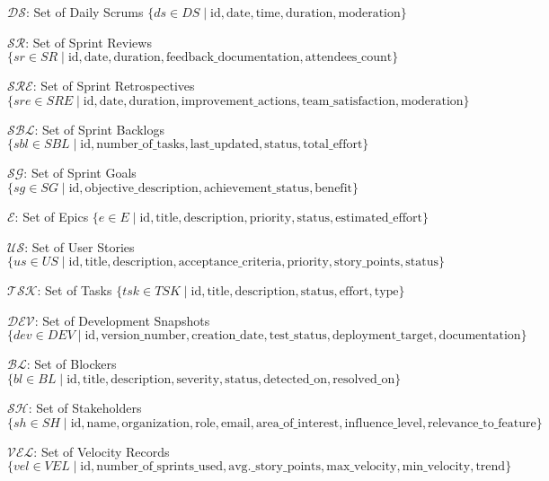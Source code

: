 \documentclass[12pt]{article}
\begin{document}
    \item $ \mathcal{DS} $: Set of Daily Scrums $ \{ ds \in DS \mid \text{id}, \text{date}, \text{time}, \text{duration}, \text{moderation} \} $
    \item $ \mathcal{SR} $: Set of Sprint Reviews $ \{ sr \in SR \mid \text{id}, \text{date}, \text{duration}, \text{feedback\_documentation}, \text{attendees\_count} \} $
    \item $ \mathcal{SRE} $: Set of Sprint Retrospectives $ \{ sre \in SRE \mid \text{id}, \text{date}, \text{duration}, \text{improvement\_actions}, \text{team\_satisfaction}, \text{moderation} \} $
    \item $ \mathcal{SBL} $: Set of Sprint Backlogs $ \{ sbl \in SBL \mid \text{id}, \text{number\_of\_tasks}, \text{last\_updated}, \text{status}, \text{total\_effort} \} $
    \item $ \mathcal{SG} $: Set of Sprint Goals $ \{ sg \in SG \mid \text{id}, \text{objective\_description}, \text{achievement\_status}, \text{benefit} \} $
    \item $ \mathcal{E} $: Set of Epics $ \{ e \in E \mid \text{id}, \text{title}, \text{description}, \text{priority}, \text{status}, \text{estimated\_effort} \} $
    \item $ \mathcal{US} $: Set of User Stories $ \{ us \in US \mid \text{id}, \text{title}, \text{description}, \text{acceptance\_criteria}, \text{priority}, \text{story\_points}, \text{status} \} $
    \item $ \mathcal{TSK} $: Set of Tasks $ \{ tsk \in TSK \mid \text{id}, \text{title}, \text{description}, \text{status}, \text{effort}, \text{type} \} $
    \item $ \mathcal{DEV} $: Set of Development Snapshots $ \{ dev \in DEV \mid \text{id}, \text{version\_number}, \text{creation\_date}, \text{test\_status}, \text{deployment\_target}, \text{documentation} \} $
    \item $ \mathcal{BL} $: Set of Blockers $ \{ bl \in BL \mid \text{id}, \text{title}, \text{description}, \text{severity}, \text{status}, \text{detected\_on}, \text{resolved\_on} \} $
    \item $ \mathcal{SH} $: Set of Stakeholders $ \{ sh \in SH \mid \text{id}, \text{name}, \text{organization}, \text{role}, \text{email}, \text{area\_of\_interest}, \text{influence\_level}, \text{relevance\_to\_feature} \} $
    \item $ \mathcal{VEL} $: Set of Velocity Records $ \{ vel \in VEL \mid \text{id}, \text{number\_of\_sprints\_used}, \text{avg.\_story\_points}, \text{max\_velocity}, \text{min\_velocity}, \text{trend} \} $
\end{document}

